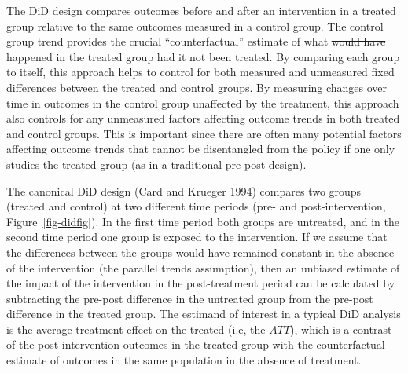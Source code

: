 \documentclass[
  letterpaper,
  DIV=11,
  numbers=noendperiod]{scrartcl}
\makeatletter
\providecommand{\DIFadd}[1]{{\protect\color{blue}\uwave{#1}}} %
\providecommand{\DIFdel}[1]{{\protect\color{red}\sout{#1}}} %
\providecommand{\DIFaddbegin}{} %
\providecommand{\DIFaddend}{} %
\providecommand{\DIFdelbegin}{} %
\providecommand{\DIFdelend}{} %
\newcommand{\DIFscaledelfig}{0.5}
\newlength{\DIFdelgraphicswidth} %
\newlength{\DIFdelgraphicsheight} %
\newcommand{\DIFaddincludegraphics}[2][]{{\color{blue}\fbox{\DIFOincludegraphics[#1]{#2}}}} %
\newcommand{\DIFdelincludegraphics}[2][]{%
\sbox{\DIFdelgraphicsbox}{\DIFOincludegraphics[#1]{#2}}%
\settoboxwidth{\DIFdelgraphicswidth}{\DIFdelgraphicsbox} %
\settoboxtotalheight{\DIFdelgraphicsheight}{\DIFdelgraphicsbox} %
\scalebox{\DIFscaledelfig}{%
\parbox[b]{\DIFdelgraphicswidth}{\usebox{\DIFdelgraphicsbox}\\[-\baselineskip] \rule{\DIFdelgraphicswidth}{0em}}\llap{\resizebox{\DIFdelgraphicswidth}{\DIFdelgraphicsheight}{%
\setlength{\unitlength}{\DIFdelgraphicswidth}%
\begin{picture}(1,1)%
\thicklines\linethickness{2pt} %
{\color[rgb]{1,0,0}\put(0,0){\framebox(1,1){}}}%
{\color[rgb]{1,0,0}\put(0,0){\line( 1,1){1}}}%
{\color[rgb]{1,0,0}\put(0,1){\line(1,-1){1}}}%
\end{picture}%
}\hspace*{3pt}}} %
} %
\DeclareRobustCommand{\DIFaddbegin}{\DIFOaddbegin \let\includegraphics\DIFaddincludegraphics} %
\DeclareRobustCommand{\DIFaddend}{\DIFOaddend \let\includegraphics\DIFOincludegraphics} %
\DeclareRobustCommand{\DIFdelbegin}{\DIFOdelbegin \let\includegraphics\DIFdelincludegraphics} %
\DeclareRobustCommand{\DIFdelend}{\DIFOaddend \let\includegraphics\DIFOincludegraphics} %
\let\sout@orig\sout %
\renewcommand{\sout}[1]{\ifmmode\text{\sout@orig{\ensuremath{#1}}}\else\sout@orig{#1}\fi} %
\makeatother
\begin{document}
The DiD design compares outcomes before and after an intervention in a
treated group relative to the same outcomes measured in a control group.
The control group trend provides the crucial ``counterfactual'' estimate
of what \DIFdelbegin \DIFdel{would have happened }\DIFdelend \DIFaddbegin \emph{\DIFadd{would have happened}} \DIFaddend in the treated group had it not been
treated. By comparing each group to itself, this approach helps to
control for both measured and unmeasured fixed differences between the
treated and control groups. By measuring changes over time in outcomes
in the control group unaffected by the treatment, this approach also
controls for any unmeasured factors affecting outcome trends in both
treated and control groups. This is important since there are often many
potential factors affecting outcome trends that cannot be disentangled
from the policy if one only studies the treated group (as in a
traditional pre-post design).

The canonical DiD design (Card and Krueger 1994) compares two groups
(treated and control) at two different time periods (pre- and
post-intervention, Figure~\ref{fig-didfig}). In the first time period
both groups are untreated, and in the second time period one group is
exposed to the intervention. If we assume that the differences between
the groups would have remained constant in the absence of the
intervention (the parallel trends assumption), then an unbiased estimate
of the impact of the intervention in the post-treatment period can be
calculated by subtracting the pre-post difference in the untreated group
from the pre-post difference in the treated group. The estimand of
interest in a typical DiD analysis is the average treatment effect on
the treated (i.e, the \(ATT\)), which is a contrast of the
post-intervention outcomes in the treated group with the counterfactual
estimate of outcomes in the same population in the absence of treatment.
\end{document}
